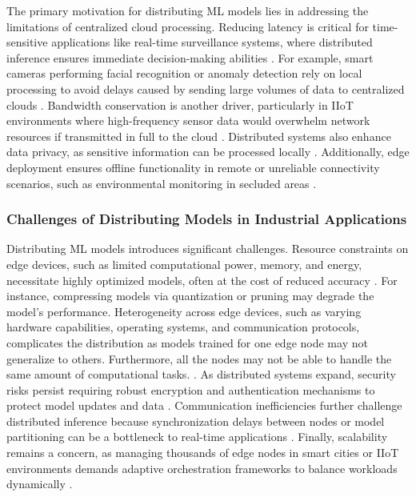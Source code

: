 \documentclass[conference]{IEEEtran}
\begin{document}
The primary motivation for distributing ML models lies in addressing the limitations of centralized cloud processing. Reducing latency is critical for time-sensitive applications like real-time surveillance systems, where distributed inference ensures immediate decision-making abilities \cite{grzesik2024combining}. For example, smart cameras performing facial recognition or anomaly detection rely on local processing to avoid delays caused by sending large volumes of data to centralized clouds \cite{filho2022systematic}. Bandwidth conservation is another driver, particularly in IIoT environments where high-frequency sensor data would overwhelm network resources if transmitted in full to the cloud \cite{grzesik2024combining}. Distributed systems also enhance data privacy, as sensitive information can be processed locally \cite{filho2022systematic}. Additionally, edge deployment ensures offline functionality in remote or unreliable connectivity scenarios, such as environmental monitoring in secluded areas \cite{grzesik2024combining}.


\subsubsection{Challenges of Distributing Models in Industrial Applications}

Distributing ML models introduces significant challenges. Resource constraints on edge devices, such as limited computational power, memory, and energy, necessitate highly optimized models, often at the cost of reduced accuracy \cite{filho2022systematic, grzesik2024combining}. For instance, compressing models via quantization or pruning may degrade the model's performance. Heterogeneity across edge devices, such as varying hardware capabilities, operating systems, and communication protocols, complicates the distribution as models trained for one edge node may not generalize to others. Furthermore, all the nodes may not be able to handle the same amount of computational tasks. \cite{grzesik2024combining}. As distributed systems expand, security risks persist requiring robust encryption and authentication mechanisms to protect model updates and data \cite{filho2022systematic}. Communication inefficiencies further challenge distributed inference because synchronization delays between nodes or model partitioning can be a bottleneck to real-time applications \cite{filho2022systematic}. Finally, scalability remains a concern, as managing thousands of edge nodes in smart cities or IIoT environments demands adaptive orchestration frameworks to balance workloads dynamically \cite{grzesik2024combining}.
\end{document}
